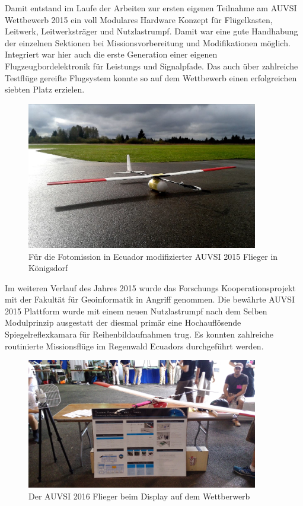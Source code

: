 Damit entstand im Laufe der Arbeiten zur ersten eigenen Teilnahme am AUVSI Wettbewerb 2015 ein voll Modulares Hardware Konzept für Flügelkasten, Leitwerk, Leitwerksträger und Nutzlastrumpf.
Damit war eine gute Handhabung der einzelnen Sektionen bei Missionsvorbereitung und Modifikationen möglich. Integriert war hier auch die erste Generation einer eigenen Flugzeugbordelektronik für Leistungs und Signalpfade. Das auch über zahlreiche Testflüge gereifte Flugsystem konnte so auf dem Wettbewerb einen erfolgreichen siebten Platz erzielen.

\begin{figure}[H]
\centering
\includegraphics[width=0.9\textwidth]{bilder/Fotos/Ecuadorflieger_Koenigsdorf.png} 
\caption{Für die Fotomission in Ecuador modifizierter AUVSI 2015 Flieger in Königsdorf} 
\label{Für die Fotomission in Ecuador modifizierter AUVSI 2015 Flieger in Königsdorf}
\end{figure}

Im weiteren Verlauf des Jahres 2015 wurde das Forschungs Kooperationsprojekt mit der Fakultät für Geoinformatik in Angriff genommen. Die bewährte AUVSI 2015 Plattform wurde mit einem neuen Nutzlastrumpf nach dem Selben Modulprinzip ausgestatt der diesmal primär eine Hochauflösende Spiegelreflexkamara für Reihenbildaufnahmen trug. Es konnten zahlreiche routinierte Missionsflüge im Regenwald Ecuadors durchgeführt werden.

\begin{figure}[H]
\centering
\includegraphics[width=0.9\textwidth]{bilder/Fotos/AUVSI_2016_Display.jpg} 
\caption{Der AUVSI 2016 Flieger beim Display auf dem Wettberwerb} 
\label{Der AUVSI 2016 Flieger beim Display auf dem Wettberwerb}
\end{figure}

